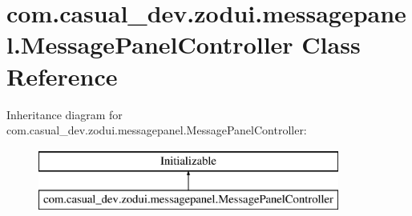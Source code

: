 \hypertarget{classcom_1_1casual__dev_1_1zodui_1_1messagepanel_1_1_message_panel_controller}{\section{com.\-casual\-\_\-dev.\-zodui.\-messagepanel.\-Message\-Panel\-Controller Class Reference}
\label{classcom_1_1casual__dev_1_1zodui_1_1messagepanel_1_1_message_panel_controller}
}
Inheritance diagram for com.\-casual\-\_\-dev.\-zodui.\-messagepanel.\-Message\-Panel\-Controller\-:\begin{figure}[H]
\begin{center}
\leavevmode
\includegraphics[height=2.000000cm]{classcom_1_1casual__dev_1_1zodui_1_1messagepanel_1_1_message_panel_controller}
\end{center}
\end{figure}
